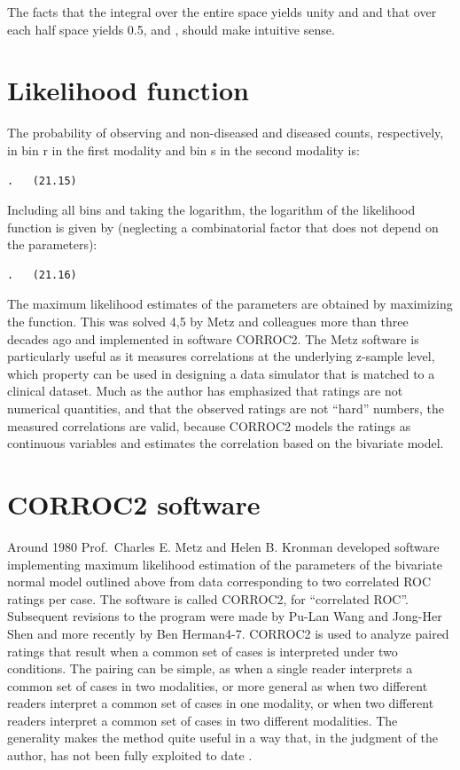 \documentclass[
]{book}
\begin{document}
The facts that the integral over the entire space yields unity and and that over each half space yields 0.5, and , should make intuitive sense.

\hypertarget{bivariate-binormal-model-likelihood}{%
\section{Likelihood function}\label{bivariate-binormal-model-likelihood}}

The probability of observing and non-diseased and diseased counts, respectively, in bin r in the first modality and bin s in the second modality is:

\begin{verbatim}
.   (21.15)
\end{verbatim}

Including all bins and taking the logarithm, the logarithm of the likelihood function is given by (neglecting a combinatorial factor that does not depend on the parameters):

\begin{verbatim}
.   (21.16)
\end{verbatim}

The maximum likelihood estimates of the parameters are obtained by maximizing the function. This was solved 4,5 by Metz and colleagues more than three decades ago and implemented in software CORROC2. The Metz software is particularly useful as it measures correlations at the underlying z-sample level, which property can be used in designing a data simulator that is matched to a clinical dataset. Much as the author has emphasized that ratings are not numerical quantities, and that the observed ratings are not ``hard'' numbers, the measured correlations are valid, because CORROC2 models the ratings as continuous variables and estimates the correlation based on the bivariate model.

\hypertarget{bivariate-binormal-model-corroc2}{%
\section{CORROC2 software}\label{bivariate-binormal-model-corroc2}}

Around 1980 Prof.~Charles E. Metz and Helen B. Kronman developed software implementing maximum likelihood estimation of the parameters of the bivariate normal model outlined above from data corresponding to two correlated ROC ratings per case. The software is called CORROC2, for ``correlated ROC''. Subsequent revisions to the program were made by Pu-Lan Wang and Jong-Her Shen and more recently by Ben Herman4-7. CORROC2 is used to analyze paired ratings that result when a common set of cases is interpreted under two conditions. The pairing can be simple, as when a single reader interprets a common set of cases in two modalities, or more general as when two different readers interpret a common set of cases in one modality, or when two different readers interpret a common set of cases in two different modalities. The generality makes the method quite useful in a way that, in the judgment of the author, has not been fully exploited to date .
\end{document}
